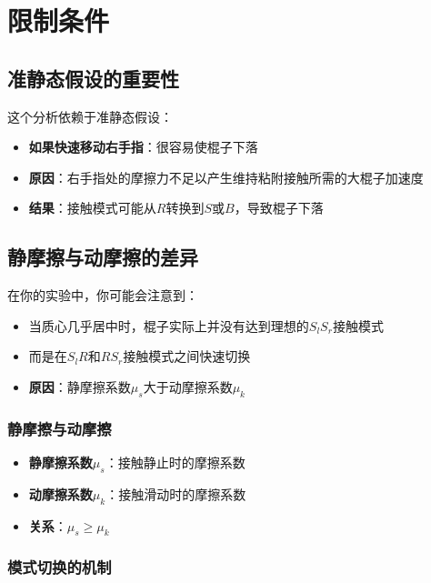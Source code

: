 \documentclass[12pt,a4paper]{article}
\begin{document}
\section{限制条件}

\subsection{准静态假设的重要性}

这个分析依赖于准静态假设：

\begin{itemize}
    \item \textbf{如果快速移动右手指}：很容易使棍子下落
    \item \textbf{原因}：右手指处的摩擦力不足以产生维持粘附接触所需的大棍子加速度
    \item \textbf{结果}：接触模式可能从$R$转换到$S$或$B$，导致棍子下落
\end{itemize}

\subsection{静摩擦与动摩擦的差异}

在你的实验中，你可能会注意到：

\begin{itemize}
    \item 当质心几乎居中时，棍子实际上并没有达到理想的$S_lS_r$接触模式
    \item 而是在$S_lR$和$RS_r$接触模式之间快速切换
    \item \textbf{原因}：静摩擦系数$\mu_s$大于动摩擦系数$\mu_k$
\end{itemize}

\subsubsection{静摩擦与动摩擦}

\begin{itemize}
    \item \textbf{静摩擦系数}$\mu_s$：接触静止时的摩擦系数
    \item \textbf{动摩擦系数}$\mu_k$：接触滑动时的摩擦系数
    \item \textbf{关系}：$\mu_s \geq \mu_k$
\end{itemize}

\subsubsection{模式切换的机制}
\end{document}

